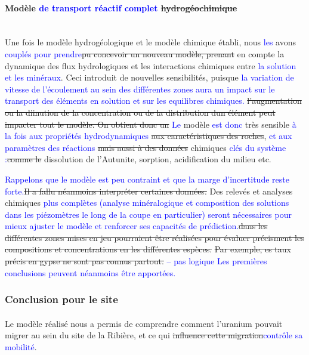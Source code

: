 \documentclass{article}
\newcommand{\blue}[1]{\textcolor{blue}{#1}} %
\begin{document}
\paragraph{Modèle \blue{de transport réactif complet} \sout{hydrogéochimique} \\ \\}
Une fois le modèle hydrogéologique et le modèle chimique établi, nous \blue{les} avons \blue{couplés pour prendre}\sout{pu concevoir un nouveau modèle, prenant} en compte la dynamique des flux hydrologiques et les interactions chimiques entre \blue{la solution et les minéraux}. Ceci introduit de nouvelles sensibilités, puisque \blue{la variation de vitesse de l'écoulement au sein des différentes zones aura un impact sur le transport des éléments en solution et sur les equilibres chimiques.} \sout{l’augmentation ou la diinution de la concentration ou de la distribution dun élément peut impacter tout le modèle. On obtient donc un} \blue{Le} modèle \blue{est donc} très sensible \blue{à la fois aux propriétés hydrodynamiques} \sout{aux caractéristiques des roches}, \blue{et aux paramètres des réactions} \sout{mais aussi à des données }chimiques \blue{clés du système :}\sout{comme le} dissolution de l'Autunite, sorption, acidification du milieu etc.

\blue{Rappelons que le modèle est peu contraint et que la marge d'incertitude reste forte.}\sout{Il a fallu néanmoins interpréter certaines données.} Des relevés et analyses chimiques \blue{plus complètes (analyse minéralogique et composition des solutions dans les piézomètres le long de la coupe en particulier) seront nécessaires pour mieux ajuster le modèle et renforcer ses capacités de prédiction.}\sout{dans les différentes zones mises en jeu pourraient être réalisées pour évaluer 
précisment les compositions et concentrations en les différentes espèces.}
\sout{Par exemple, es taux précis en gypse ne sont pas connus partout.}\blue{ -- pas logique}
\blue{Les premières conclusions peuvent néanmoins être apportées.}

\subsubsection{Conclusion pour le site}
\paragraph{} Le modèle réalisé nous a permis de comprendre comment l’uranium pouvait migrer au sein du site de la Ribière, et ce qui \sout{influence cette migration}\blue{contrôle sa mobilité}. 
\end{document}
